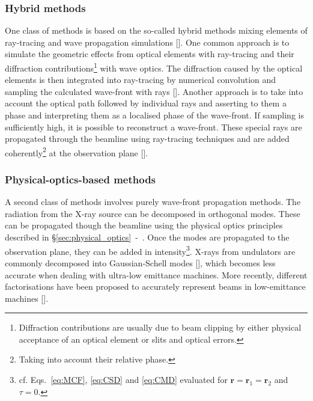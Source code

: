\begin{refsection}
\subsubsection*{Hybrid methods}

One class of methods is based on the so-called hybrid methods mixing elements of ray-tracing and wave propagation simulations [\cite{Semichaevsky2001}]. One common approach is to simulate the geometric effects from optical elements with ray-tracing and their diffraction contributions\footnote{Diffraction contributions are usually due to beam clipping by either physical acceptance of an optical element or slits and optical errors.} with wave optics. The diffraction caused by the optical elements is then integrated into ray-tracing by numerical convolution and sampling the calculated wave-front with rays [\cite{Shi2014}]. Another approach is to take into account the optical path followed by individual rays and asserting to them a phase and interpreting them as a localised phase of the wave-front. If sampling is sufficiently high, it is possible to reconstruct a wave-front. These special rays are propagated through the beamline using ray-tracing techniques and are added coherently\footnote{Taking into account their relative phase.} at the observation plane [\cite{Keller1962}].

\subsubsection*{Physical-optics-based methods}

A second class of methods involves purely wave-front propagation methods. The radiation from the X-ray source can be decomposed in orthogonal modes. These can be propagated though the beamline using the physical optics principles described in §\ref{sec:physical_optics}~-~\textit{}. Once the modes are propagated to the observation plane, they can be added in intensity\footnote{cf. Eqs.~\ref{eq:MCF}, \ref{eq:CSD} and \ref{eq:CMD} evaluated for $\textbf{r}=\textbf{r}_1=\textbf{r}_2$ and $\tau=0$.}. X-rays from undulators are commonly decomposed into Gaussian-Schell modes
[\cite{Coisson1997, Singer2011}], which becomes less accurate when dealing with ultra-low emittance machines. More recently, different factorisations have been proposed to accurately represent beams in low-emittance machines [\cite{Lindberg2015, Glass_2017}].


\end{refsection}
